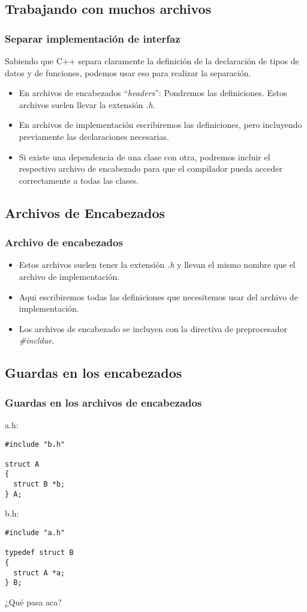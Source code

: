 \documentclass{beamer}
\begin{document}
\subsection{Trabajando con muchos archivos}

\begin{frame}
\frametitle{Separar implementación de interfaz}
Sabiendo que C++ separa claramente la definición de la declaración de tipos de datos y de funciones, podemos usar eso para realizar la separación.
\begin{itemize}
 \item En archivos de encabezados ``\emph{headers}'': Pondremos las definiciones. Estos archivos suelen llevar la extensión \emph{.h}.
 \item En archivos de implementación escribiremos las definiciones, pero incluyendo previamente las declaraciones necesarias.
 \item Si existe una dependencia de una clase con otra, podremos incluir el respectivo archivo de encabezado para que el compilador pueda acceder correctamente a todas las clases.
\end{itemize}
\end{frame}


\subsection{Archivos de Encabezados}
\begin{frame}
\frametitle{Archivo de encabezados}
\begin{itemize}
 \item Estos archivos suelen tener la extensión \emph{.h} y llevan el mismo nombre que el archivo de implementación.
 \item Aqui escribiremos todas las definiciones que necesitemos usar del archivo de implementación.
 \item Los archivos de encabezado se incluyen con la directiva de preprocesador \emph{\#incldue}.
\end{itemize}

\end{frame}

\subsection{Guardas en los encabezados}
\begin{frame}[fragile]
\frametitle{Guardas en los archivos de encabezados}
a.h:
\begin{verbatim}
#include "b.h"

struct A
{
  struct B *b;
} A;
\end{verbatim}

b.h:
\begin{verbatim}
#include "a.h"

typedef struct B
{
  struct A *a;
} B;
\end{verbatim}

¿Qué pasa aca?
\end{frame}
\end{document}
